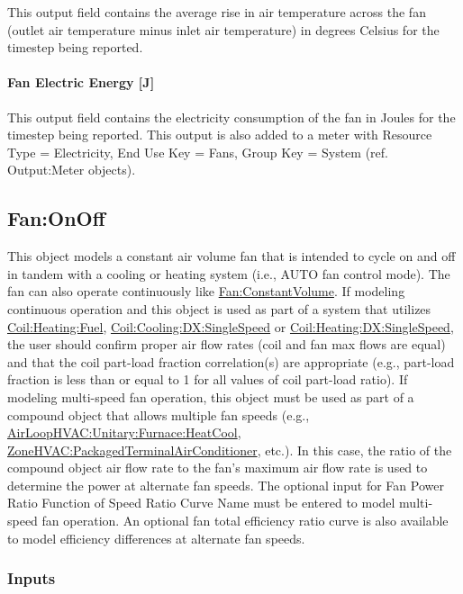This output field contains the average rise in air temperature across the fan (outlet air temperature minus inlet air temperature) in degrees Celsius for the timestep being reported.

\paragraph{Fan Electric Energy {[}J{]}}\label{fan-electric-energy-j}

This output field contains the electricity consumption of the fan in Joules for the timestep being reported. This output is also added to a meter with Resource Type = Electricity, End Use Key = Fans, Group Key = System (ref. Output:Meter objects).

\subsection{Fan:OnOff}\label{fanonoff}

This object models a constant air volume fan that is intended to cycle on and off in tandem with a cooling or heating system (i.e., AUTO fan control mode). The fan can also operate continuously like \hyperref[fanconstantvolume]{Fan:ConstantVolume}. If modeling continuous operation and this object is used as part of a system that utilizes \hyperref[coilheatinggas-000]{Coil:Heating:Fuel}, \hyperref[coilcoolingdxsinglespeed]{Coil:Cooling:DX:SingleSpeed} or \hyperref[coilheatingdxsinglespeed]{Coil:Heating:DX:SingleSpeed}, the user should confirm proper air flow rates (coil and fan max flows are equal) and that the coil part-load fraction correlation(s) are appropriate (e.g., part-load fraction is less than or equal to 1 for all values of coil part-load ratio). If modeling multi-speed fan operation, this object must be used as part of a compound object that allows multiple fan speeds (e.g., \hyperref[airloophvacunitaryfurnaceheatcool]{AirLoopHVAC:Unitary:Furnace:HeatCool}, \hyperref[zonehvacpackagedterminalairconditioner]{ZoneHVAC:PackagedTerminalAirConditioner}, etc.). In this case, the ratio of the compound object air flow rate to the fan's maximum air flow rate is used to determine the power at alternate fan speeds. The optional input for Fan Power Ratio Function of Speed Ratio Curve Name must be entered to model multi-speed fan operation. An optional fan total efficiency ratio curve is also available to model efficiency differences at alternate fan speeds.

\subsubsection{Inputs}\label{inputs-1-017}

